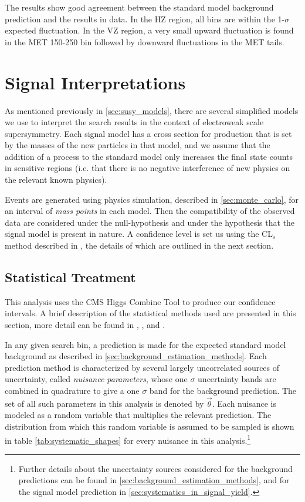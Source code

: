    The results show good agreement between the standard model background prediction and the results in data. In the HZ region, all bins are within the 1-$\sigma$ expected fluctuation. In the VZ region, a very small upward fluctuation is found in the MET 150-250 bin followed by downward fluctuations in the MET tails.

    \clearpage

\section{Signal Interpretations} \label{sec:signal_interpretations}

  As mentioned previously in \ref{sec:susy_models}, there are several simplified models we use to interpret the search results in the context of electroweak scale supersymmetry. Each signal model has a cross section for production that is set by the masses of the new particles in that model, and we assume that the addition of a process to the standard model only increases the final state counts in sensitive regions (i.e. that there is no negative interference of new physics on the relevant known physics). 

  Events are generated using physics simulation, described in \ref{sec:monte_carlo}, for an interval of \emph{mass points} in each model. Then the compatibility of the observed data are considered under the null-hypothesis and under the hypothesis that the signal model is present in nature. A confidence level is set us using the CL$_s$ method described in \cite{CLS_method}, the details of which are outlined in the next section.

  \subsection{Statistical Treatment} \label{sec:statistical_treatment}
    This analysis uses the CMS Higgs Combine Tool \cite{higgs_combine} to produce our confidence intervals. A brief description of the statistical methods used are presented in this section, more detail can be found in \cite{higgs_combine}, \cite{Likelihood_Cowen_Cranmer}, and \cite{CLS_method}. 

    In any given search bin, a prediction is made for the expected standard model background as described in \ref{sec:background_estimation_methods}. Each prediction method is characterized by several largely uncorrelated sources of uncertainty, called \emph{nuisance parameters}, whose one $\sigma$ uncertainty bands are combined in quadrature to give a one $\sigma$ band for the background prediction. The set of all such parameters in this analysis is denoted by $\vec{\theta}$. Each nuisance is modeled as a random variable that multiplies the relevant prediction. The distribution from which this random variable is assumed to be sampled is shown in table \ref{tab:systematic_shapes} for every nuisance in this analysis.\footnote{Further details about the uncertainty sources considered for the background predictions can be found in \ref{sec:background_estimation_methods}, and for the signal model prediction in \ref{sec:systematics_in_signal_yield}.}

